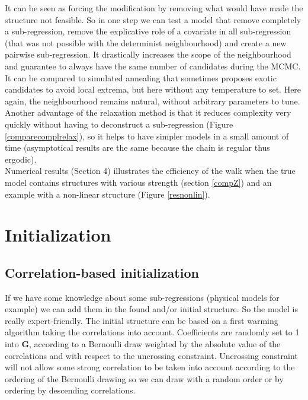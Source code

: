 \documentclass[12pt,a4paper]{report}
\begin{document}
	It can be seen as forcing the modification by removing what would have made the structure not feasible. So in one step we can test a model that remove completely a sub-regression, remove the explicative role of a covariate in all sub-regression (that was not possible with the determinist neighbourhood) and create a new pairwise sub-regression. It drastically increases the scope of the neighbourhood and guarantee to always have the same number of candidates during the MCMC. It can be compared to simulated annealing that sometimes proposes exotic candidates to avoid local extrema, but here without any temperature to set. Here again, the neighbourhood remains natural, without arbitrary parameters to tune. \\
	
	Another advantage of the relaxation method is that it reduces complexity very quickly without having to deconstruct a sub-regression (Figure \ref{comparecomplrelax}), so it helps to have simpler models in a small amount of time (asymptotical results are the same because the chain is regular thus ergodic).\\
			
Numerical results (Section 4) illustrates the efficiency of the walk when the true model contains structures with various strength (section \ref{compZ}) and an example with a non-linear structure (Figure \ref{resnonlin}).
		
		
		
	\section{Initialization}
		\subsection{Correlation-based initialization}
		 If we have some knowledge about some sub-regressions (physical models for example) we can add them in the found and/or initial structure. So the model is really expert-friendly.
The initial structure can be based on a first warming algorithm taking the correlations into account. Coefficients are randomly set to 1 into $\boldsymbol{G}$, according to a Bernoulli draw weighted by the absolute value of the correlations and with respect to the uncrossing constraint. Uncrossing constraint will not allow some strong correlation to be taken into account according to the ordering of the Bernoulli drawing so we can draw with a random order or by ordering by descending correlations.\\
		
\end{document}
